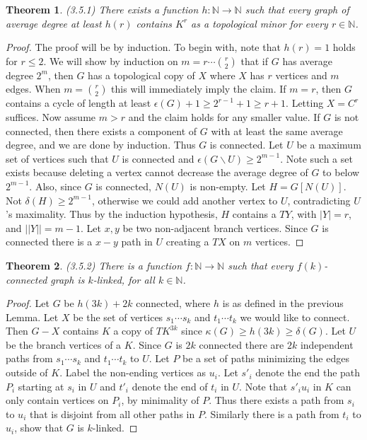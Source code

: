 \documentclass[12pt]{article}
\newtheorem{theorem}{Theorem}
\begin{document}
\begin{theorem} (3.5.1) There exists a function
  $h: \mathbb{N} \to \mathbb{N}$ such that every graph of average
  degree at least $h(r)$ contains $K^r$ as a topological minor for
  every $r \in \mathbb{N}$.
\end{theorem}
\begin{proof} The proof will be by induction. To begin with, note that
  $h(r) = 1$ holds for $r \leq 2$. We will show by induction on
  $m = r \cdots {r \choose 2}$ that if $G$ has average degree $2 ^ m$,
  then $G$ has a topological copy of $X$ where $X$ has $r$ vertices
  and $m$ edges. When $m = {r \choose 2}$ this will immediately imply
  the claim. If $m = r$, then $G$ contains a cycle of length at least
  $\epsilon(G) + 1 \geq 2^{r -1} + 1 \geq r + 1$. Letting $X = C^r$
  suffices. Now assume $m > r$ and the claim holds for any smaller
  value. If $G$ is not connected, then there exists a component of $G$
  with at least the same average degree, and we are done by
  induction. Thus $G$ is connected. Let $U$ be a maximum set of
  vertices such that $U$ is connected and
  $\epsilon(G \backslash U) \geq 2 ^ {m - 1}$. Note such a set exists
  because deleting a vertex cannot decrease the average degree of $G$
  to below $2 ^ {m - 1}$. Also, since $G$ is connected, $N(U)$ is
  non-empty. Let $H = G[N(U)]$. Not $\delta(H) \geq 2 ^ {m -1}$,
  otherwise we could add another vertex to $U$, contradicting $U$'s
  maximality. Thus by the induction hypothesis, $H$ contains a $TY$,
  with $|Y| = r$, and $||Y|| = m - 1$. Let $x,y$ be two non-adjacent
  branch vertices. Since $G$ is connected there is a $x-y$ path in $U$
  creating a $TX$ on $m$ vertices.
\end{proof}

\begin{theorem} (3.5.2) There is a function
  $f: \mathbb{N} \to \mathbb{N}$ such that every $f(k)$-connected
  graph is $k$-linked, for all $k \in \mathbb{N}$.
\end{theorem}
\begin{proof} Let $G$ be $h(3k) + 2k$ connected, where $h$ is as
  defined in the previous Lemma. Let $X$ be the set of vertices
  $s_1 \cdots s_k$ and $t_1 \cdots t_k$ we would like to connect. Then
  $G - X$ contains $K$ a copy of $TK^{3k}$ since
  $\kappa(G) \geq h(3k) \geq \delta(G)$. Let $U$ be the branch
  vertices of a $K$. Since $G$ is $2k$ connected there are $2k$
  independent paths from $s_1 \cdots s_k$ and $t_1 \cdots t_k$ to
  $U$. Let $P$ be a set of paths minimizing the edges outside of
  $K$. Label the non-ending vertices as $u_i$. Let $s'_i$ denote the
  end the path $P_i$ starting at $s_i$ in $U$ and $t'_i$ denote the
  end of $t_i$ in $U$. Note that $s'_i u_i$ in $K$ can only contain
  vertices on $P_i$, by minimality of $P$. Thus there exists a path
  from $s_i$ to $u_i$ that is disjoint from all other paths in
  $P$. Similarly there is a path from $t_i$ to $u_i$, show that $G$ is
  $k$-linked.
\end{proof}
\end{document}
